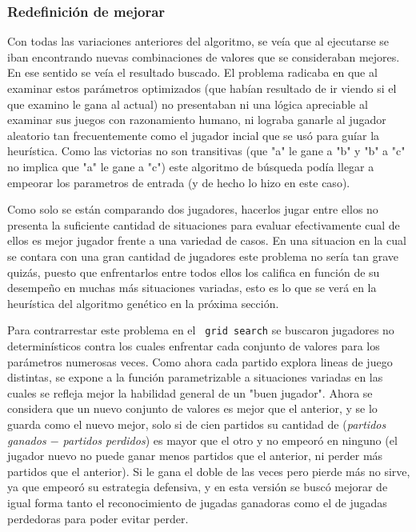 \documentclass[A4paper,oneside,fleqn,11pt]{article}
\theoremstyle{definition}
\begin{document}
\subsubsection {Redefinición de mejorar}


Con todas las variaciones anteriores del algoritmo, se veía que al ejecutarse se iban encontrando nuevas combinaciones de valores que se consideraban mejores. En ese sentido se veía el resultado buscado. El problema radicaba en que al examinar estos parámetros optimizados (que habían resultado de ir viendo si el que examino le gana al actual) no presentaban ni una lógica apreciable al examinar sus juegos con razonamiento humano, ni lograba ganarle al jugador aleatorio tan frecuentemente como el jugador incial que se usó para guíar la heurística.  Como las victorias no son transitivas (que "a" le gane a "b" y "b" a "c" no implica que "a" le gane a "c") este algoritmo de búsqueda podía llegar a empeorar los parametros de entrada (y de hecho lo hizo en este caso).

Como solo se están comparando dos jugadores, hacerlos jugar entre ellos no presenta la suficiente cantidad de situaciones para evaluar efectivamente cual de ellos es mejor jugador frente a una variedad de casos. En una situacion en la cual se contara con una gran cantidad de jugadores este problema no sería tan grave quizás, puesto que enfrentarlos entre todos ellos los califica en función de su desempeño en muchas más situaciones variadas, esto es lo que se verá en la heurística del algoritmo genético en la próxima sección.

Para contrarrestar este problema en el \texttt{ grid search} se buscaron jugadores no determinísticos contra los cuales enfrentar cada conjunto de valores para los parámetros numerosas veces. Como ahora cada partido explora lineas de juego distintas, se expone a la función parametrizable a situaciones variadas en las cuales se refleja mejor la habilidad general de un "buen jugador". Ahora se considera que un nuevo conjunto de valores es mejor que el anterior, y se lo guarda como el nuevo mejor, solo si de cien partidos su cantidad de (\textit{partidos ganados $-$ partidos perdidos}) es mayor que el otro y no empeoró en ninguno (el jugador nuevo no puede ganar menos partidos que el anterior, ni perder más partidos que el anterior). Si le gana el doble de las veces pero pierde más no sirve, ya que empeoró su estrategia defensiva, y en esta versión se buscó mejorar de igual forma tanto el reconocimiento de jugadas ganadoras como el de jugadas perdedoras para poder evitar perder. 
\end{document}

